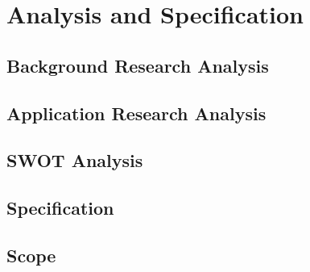 \section{Analysis and Specification}

\subsection{Background Research Analysis}

\subsection{Application Research Analysis}

\subsection{SWOT Analysis}

\subsection{Specification}

\subsection{Scope}
